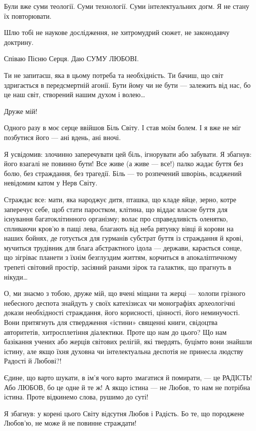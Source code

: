 Були вже суми теології. Суми технології. Суми інтелектуальних догм. Я не стану
їх повторювати.

Шлю тобі не наукове дослідження, не хитромудрий сюжет, не законодавчу доктрину.

Співаю Пісню Серця. Даю СУМУ ЛЮБОВІ.

Ти не запитаєш, яка в цьому потреба та необхідність. Ти бачиш, що світ
здригається в передсмертній агонії. Бути йому чи не бути — залежить від нас, бо
це наш світ, створений нашим духом і волею…

Друже мій!

Одного разу в моє серце ввійшов Біль Світу. І став моїм болем. І я вже не міг
позбутися його — ані вдень, ані вночі.

Я усвідомив: злочинно заперечувати цей біль, ігнорувати або забувати. Я
збагнув: його взагалі не повинно бути! Все живе (а живе — все!) палко жадає
буття без болю, без страждання, без трагедії. Біль — то розпечений шворінь,
всаджений невідомим катом у Нерв Світу.

Страждає все: мати, яка народжує дитя, пташка, що кладе яйце, зерно, котре
заперечує себе, щоб стати паростком, клітина, що віддає власне буття для
існування багатоклітинного організму; волає про справедливість оленятко,
спливаючи кров’ю в пащі лева, благають від неба рятунку вівці й корови на наших
бойнях, де готується для гурманів субстрат буття із страждання й крові,
мучиться трудівник для блага абстрактного ідола — держави, карається сонце, що
зігріває планети з їхнім безглуздим життям, корчиться в апокаліптичному трепеті
світовий простір, засіяний ранами зірок та галактик, що прагнуть в нікуди…

О, ми знаємо з тобою, друже мій, що вчені міщани та жерці — холопи грізного
небесного деспота знайдуть у своїх катехізисах чи монографіях археологічні
докази необхідності страждання, його корисності, цінності, його неминучості.
Вони притягнуть для ствердження «істини» священні книги, свідоцтва авторитетів,
хитросплетіння діалектики. Проте що нам до цього? Що нам базікання учених або
жерців світових релігій, які твердять, буцімто вони знайшли істину, але якщо
їхня духовна чи інтелектуальна деспотія не принесла людству Радості й Любові?!

Єдине, що варто шукати, в ім’я чого варто змагатися й помирати, — це РАДІСТЬ! Або ЛЮБОВ, бо це одне й те ж! А якщо істина — не Любов, то нам не потрібна істина. Проте відкинемо слова, рушимо до суті!

Я збагнув: у корені цього Світу відсутня Любов і Радість. Бо те, що породжене Любов’ю, не може й не повинне страждати!

